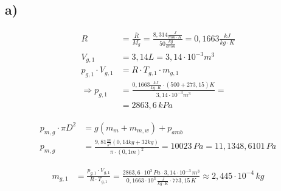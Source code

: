 

\subsection*{a)}

\begin{align*}
R &= \frac{\bar{R}}{M_g} = \frac{8,314 \frac{J}{mol \cdot K}}{50 \frac{kg}{kmol}} = 0,1663 \frac{kJ}{kg \cdot K} \\
V_{g,1} &= 3,14 L = 3,14 \cdot 10^{-3} m^3 \\
p_{g,1} \cdot V_{g,1} &= R \cdot T_{g,1} \cdot m_{g,1} \\
\Rightarrow p_{g,1} &= \frac{0,1663 \frac{kJ}{kg \cdot K} \cdot (500 + 273,15) K}{3,14 \cdot 10^{-3} m^3} = \\
&= 2863,6 \, kPa
\end{align*}

\begin{align*}
p_{m,g} \cdot \pi D^2 &= g \left( m_m + m_{m,w} \right) + p_{amb} \\
p_{m,g} &= \frac{9,81 \frac{m}{s^2} (0,14 kg + 32 kg)}{\pi \cdot (0,1 m)^2} = 10023 \, Pa = 11,1348,6101 \, Pa
\end{align*}

\begin{align*}
m_{g,1} &= \frac{p_{g,1} \cdot V_{g,1}}{R \cdot T_{g,1}} = \frac{2863,6 \cdot 10^3 \, Pa \cdot 3,14 \cdot 10^{-3} \, m^3}{0,1663 \cdot 10^3 \, \frac{J}{kg \cdot K} \cdot 773,15 \, K} \approx 2,445 \cdot 10^{-4} \, kg
\end{align*}